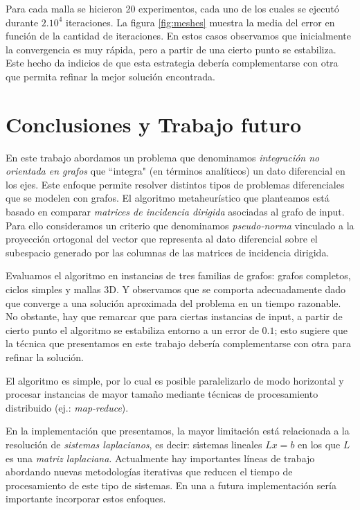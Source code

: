 \documentclass[10pt, a4paper, twocolumn]{article} %
\begin{document}
\smallskip

Para cada malla se hicieron 20 experimentos, cada uno de los cuales se 
ejecutó durante $2.10^4$ iteraciones. La figura \ref{fig:meshes} 
muestra la media del error en función de la cantidad de iteraciones. En 
estos casos observamos que inicialmente la convergencia es muy rápida, 
pero a partir de una cierto punto se estabiliza. Este hecho da 
indicios de que esta estrategia debería complementarse con otra que 
permita refinar la mejor solución encontrada.


\newpage

\section{Conclusiones y Trabajo futuro}

En este trabajo abordamos un problema que denominamos \emph{integración 
no orientada en grafos} que ``integra" (en términos analíticos) un dato 
diferencial en los ejes. Este enfoque permite resolver distintos tipos 
de problemas diferenciales que se modelen con grafos. El algoritmo 
metaheurístico que planteamos está basado en comparar \emph{matrices 
de incidencia dirigida} asociadas al grafo de input. Para ello 
consideramos un criterio que denominamos \emph{pseudo-norma} vinculado 
a la proyección ortogonal del vector que representa al dato diferencial 
sobre el subespacio generado por las columnas de las matrices de 
incidencia dirigida.

\bigskip

Evaluamos el algoritmo en instancias de tres familias de grafos: grafos 
completos, ciclos simples y mallas 3D. Y observamos que se comporta 
adecuadamente dado que converge a una solución aproximada del problema 
en un tiempo razonable. No obstante, hay que remarcar que para ciertas 
instancias de input, a partir de cierto punto el algoritmo se 
estabiliza entorno a un error de $0.1$; esto sugiere que la técnica que 
presentamos en este trabajo debería complementarse con otra para 
refinar la solución.

\bigskip

El algoritmo es simple, por lo cual es posible paralelizarlo de modo 
horizontal y procesar instancias de mayor tamaño mediante técnicas 
de procesamiento distribuido (ej.: \emph{map-reduce}).

\bigskip

En la implementación que presentamos, la mayor limitación está 
relacionada a la resolución de \emph{sistemas laplacianos}, es decir: 
sistemas lineales $Lx=b$ en los que $L$ es una \emph{matriz 
laplaciana}. Actualmente hay importantes líneas de trabajo abordando 
nuevas metodologías iterativas que reducen el tiempo de 
procesamiento de este tipo de sistemas. En una a futura implementación
 sería importante incorporar estos enfoques. 
\end{document}
